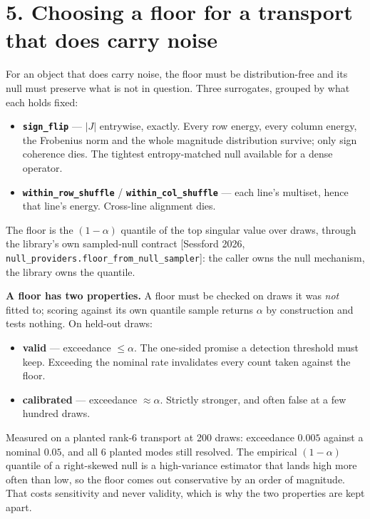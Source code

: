 \documentclass[10pt,letterpaper,twocolumn]{article}
\providecommand{\tightlist}{\setlength{\itemsep}{0pt}\setlength{\parskip}{0pt}}
\begin{document}
\section{5. Choosing a floor for a transport that does carry noise}\label{5-choosing-a-floor-for-a-transport-that-does-carry-noise}

For an object that does carry noise, the floor must be distribution-free and its null must preserve what is not in question. Three surrogates, grouped by what each holds fixed:

\begin{itemize}
\tightlist
\item
  \textbf{\texttt{sign\_\allowbreak{}flip}} --- \(\lvert J\rvert\) entrywise, exactly. Every row energy, every column energy, the Frobenius norm and the whole magnitude distribution survive; only sign coherence dies. The tightest entropy-matched null available for a dense operator.
\item
  \textbf{\texttt{within\_\allowbreak{}row\_\allowbreak{}shuffle}} / \textbf{\texttt{within\_\allowbreak{}col\_\allowbreak{}shuffle}} --- each line's multiset, hence that line's energy. Cross-line alignment dies.
\end{itemize}

The floor is the \((1-\alpha)\) quantile of the top singular value over draws, through the library's own sampled-null contract {[}Sessford 2026, \texttt{null\_\allowbreak{}providers.\allowbreak{}floor\_\allowbreak{}from\_\allowbreak{}null\_\allowbreak{}sampler}{]}: the caller owns the null mechanism, the library owns the quantile.

\textbf{A floor has two properties.} A floor must be checked on draws it was \emph{not} fitted to; scoring against its own quantile sample returns \(\alpha\) by construction and tests nothing. On held-out draws:

\begin{itemize}
\tightlist
\item
  \textbf{valid} --- exceedance \(\le\alpha\). The one-sided promise a detection threshold must keep. Exceeding the nominal rate invalidates every count taken against the floor.
\item
  \textbf{calibrated} --- exceedance \(\approx\alpha\). Strictly stronger, and often false at a few hundred draws.
\end{itemize}

Measured on a planted rank-6 transport at 200 draws: exceedance \(0.005\) against a nominal \(0.05\), and all 6 planted modes still resolved. The empirical \((1-\alpha)\) quantile of a right-skewed null is a high-variance estimator that lands high more often than low, so the floor comes out conservative by an order of magnitude. That costs sensitivity and never validity, which is why the two properties are kept apart.
\end{document}
